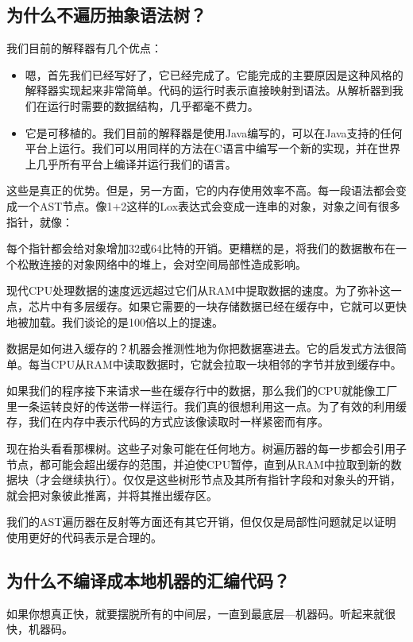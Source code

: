\documentclass[cn,11pt,chinese]{elegantbook}
\begin{document}
\subsection{为什么不遍历抽象语法树？}

我们目前的解释器有几个优点：

\begin{itemize}
  \item 嗯，首先我们已经写好了，它已经完成了。它能完成的主要原因是这种风格的解释器实现起来非常简单。代码的运行时表示直接映射到语法。从解析器到我们在运行时需要的数据结构，几乎都毫不费力。
  \item 它是可移植的。我们目前的解释器是使用Java编写的，可以在Java支持的任何平台上运行。我们可以用同样的方法在C语言中编写一个新的实现，并在世界上几乎所有平台上编译并运行我们的语言。
\end{itemize}

这些是真正的优势。但是，另一方面，它的内存使用效率不高。每一段语法都会变成一个AST节点。像1+2这样的Lox表达式会变成一连串的对象，对象之间有很多指针，就像：

每个指针都会给对象增加32或64比特的开销。更糟糕的是，将我们的数据散布在一个松散连接的对象网络中的堆上，会对空间局部性造成影响。

现代CPU处理数据的速度远远超过它们从RAM中提取数据的速度。为了弥补这一点，芯片中有多层缓存。如果它需要的一块存储数据已经在缓存中，它就可以更快地被加载。我们谈论的是100倍以上的提速。

数据是如何进入缓存的？机器会推测性地为你把数据塞进去。它的启发式方法很简单。每当CPU从RAM中读取数据时，它就会拉取一块相邻的字节并放到缓存中。

如果我们的程序接下来请求一些在缓存行中的数据，那么我们的CPU就能像工厂里一条运转良好的传送带一样运行。我们真的很想利用这一点。为了有效的利用缓存，我们在内存中表示代码的方式应该像读取时一样紧密而有序。

现在抬头看看那棵树。这些子对象可能在任何地方。树遍历器的每一步都会引用子节点，都可能会超出缓存的范围，并迫使CPU暂停，直到从RAM中拉取到新的数据块（才会继续执行）。仅仅是这些树形节点及其所有指针字段和对象头的开销，就会把对象彼此推离，并将其推出缓存区。

我们的AST遍历器在反射等方面还有其它开销，但仅仅是局部性问题就足以证明使用更好的代码表示是合理的。

\subsection{为什么不编译成本地机器的汇编代码？}

如果你想真正快，就要摆脱所有的中间层，一直到最底层—机器码。听起来就很快，机器码。
\end{document}
